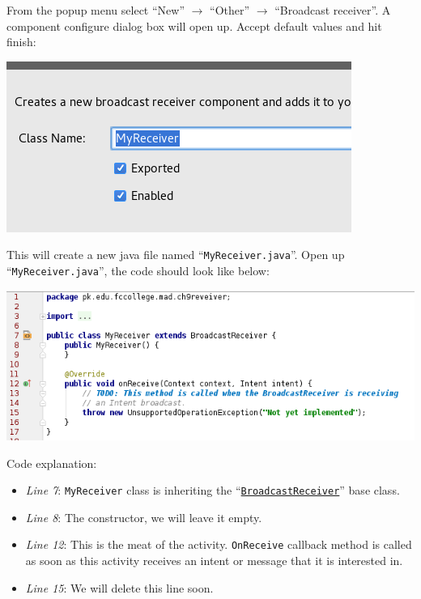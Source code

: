 From the popup menu select ``New'' $\rightarrow$ ``Other'' $\rightarrow$ ``Broadcast receiver''. A component configure dialog box will open up. Accept default values and hit finish:

\begin{center}
	\includegraphics[scale=0.4]{chapters/ch09/images/31}
\end{center}

This will create a new java file named ``\texttt{MyReceiver.java}''. Open up ``\texttt{MyReceiver.java}'', the code should look like below:

\begin{center}
	\includegraphics[scale=0.4]{chapters/ch09/images/32}
\end{center}

Code explanation:

\begin{itemize}
	\item \textit{Line 7}: \texttt{MyReceiver} class is inheriting the ``\href{https://developer.android.com/reference/android/content/BroadcastReceiver.html}{\texttt{BroadcastReceiver}}'' base class.
	
	\item \textit{Line 8}: The constructor, we will leave it empty.
	
	\item \textit{Line 12}: This is the meat of the activity. \texttt{OnReceive} callback method is called as soon as this activity receives an intent or message that it is interested in.
	
	\item \textit{Line 15}: We will delete this line soon.

\end{itemize}

